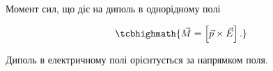 \documentclass{beamer}
\begin{document}



\begin{frame}{Момент сил, що діє на диполь в однорідному полі}{}
	\begin{center}
		
	\end{center}

	\begin{equation*}
		\tcbhighmath{
			\vec{M} = \left[\vec{p}\times\vec{E}\right].
		}
	\end{equation*}

	\begin{alertblock}{}
		Диполь в електричному полі орієнтується за напрямком поля.
	\end{alertblock}
\end{frame}
\end{document}
